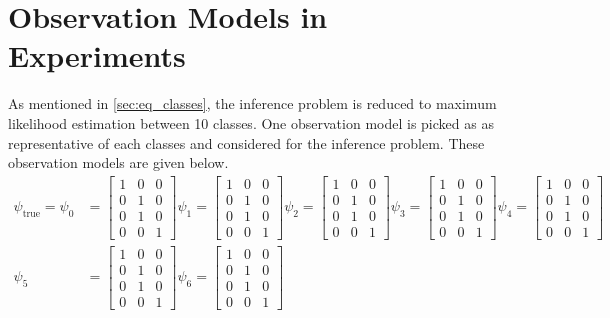 \section{Observation Models in Experiments}
As mentioned in \cref{sec:eq_classes}, the inference problem is reduced to maximum likelihood estimation between 10 classes. One observation model is picked as as representative of each classes and considered for the inference problem. These observation models are given below.
\begin{align}
\psi_{\text{true}} = \psi_{0} &=
\begin{bmatrix}
1 & 0 & 0 \\
0 & 1 & 0 \\
0 & 1 & 0 \\
0 & 0 & 1
\end{bmatrix}
\psi_{1} =
\begin{bmatrix}
1 & 0 & 0 \\
0 & 1 & 0 \\
0 & 1 & 0 \\
0 & 0 & 1
\end{bmatrix}
\psi_{2} =
\begin{bmatrix}
1 & 0 & 0 \\
0 & 1 & 0 \\
0 & 1 & 0 \\
0 & 0 & 1
\end{bmatrix}
\psi_{3} =
\begin{bmatrix}
1 & 0 & 0 \\
0 & 1 & 0 \\
0 & 1 & 0 \\
0 & 0 & 1
\end{bmatrix}
\psi_{4} =
\begin{bmatrix}
1 & 0 & 0 \\
0 & 1 & 0 \\
0 & 1 & 0 \\
0 & 0 & 1
\end{bmatrix} \\
\psi_{5} &=
\begin{bmatrix}
1 & 0 & 0 \\
0 & 1 & 0 \\
0 & 1 & 0 \\
0 & 0 & 1
\end{bmatrix}
\psi_{6} =
\begin{bmatrix}
1 & 0 & 0 \\
0 & 1 & 0 \\
0 & 1 & 0 \\
0 & 0 & 1
\end{bmatrix}

\end{align}
